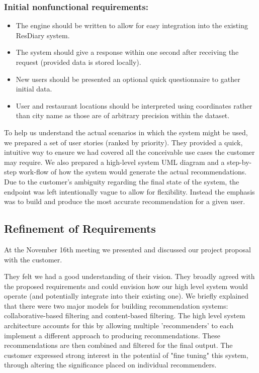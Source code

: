 \documentclass{l3proj}
\begin{document}
\subsubsection{Initial nonfunctional requirements:}
\begin{itemize}
\item The engine should be written to allow for easy integration into the existing ResDiary system.
\item The system should give a response within one second after receiving the request (provided data is stored locally).
\item New users should be presented an optional quick questionnaire to gather initial data.
\item User and restaurant locations should be interpreted using coordinates rather than city name as those are of arbitrary precision within the dataset.
\end{itemize}

To help us understand the actual scenarios in which the system might be used, we prepared a set of user stories (ranked by priority). They provided a quick, intuitive way to ensure we had covered all the conceivable use cases the customer may require. We also prepared a high-level system UML diagram and a step-by-step work-flow of how the system would generate the actual recommendations. Due to the customer's ambiguity regarding the final state of the system, the endpoint was left intentionally vague to allow for flexibility. Instead the emphasis was to build and produce the most accurate recommendation for a given user. 


\subsection{Refinement of Requirements}
\label{sec:custrefineinitobj}

At the November 16th meeting we presented and discussed our project proposal with the customer.

They felt we had a good understanding of their vision. They broadly agreed with the proposed requirements and could envision how our high level system would operate (and potentially integrate into their existing one). We briefly explained that there were two major models for building recommendation systems: collaborative-based filtering and content-based filtering. The high level system architecture accounts for this by allowing multiple 'recommenders' to each implement a different approach to producing recommendations. These recommendations are then combined and filtered for the final output. The customer expressed strong interest in the potential of "fine tuning" this system, through altering the significance placed on individual recommenders. 
\end{document}

